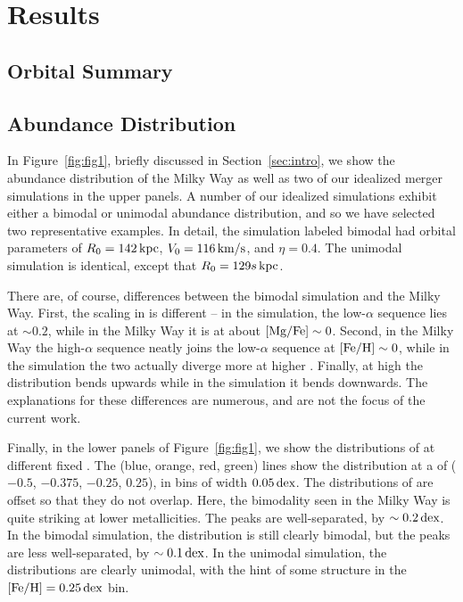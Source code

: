 \section{Results}\label{sec:results}
\subsection{Orbital Summary}\label{ssec:orbit}

\subsection{Abundance Distribution}\label{ssec:abundplane}
In Figure~\ref{fig:fig1}, briefly discussed in Section~\ref{sec:intro}, we show the abundance distribution of the Milky Way as well as two of our idealized merger simulations in the upper panels. A number of our idealized simulations exhibit either a bimodal or unimodal abundance distribution, and so we have selected two representative examples. In detail, the simulation labeled bimodal had orbital parameters of $R_0=142\,\textrm{kpc}$, $V_0=116\,\textrm{km}/\textrm{s}$, and $\eta=0.4$. The unimodal simulation is identical, except that $R_0=129s\,\textrm{kpc}$.

There are, of course, differences between the bimodal simulation and the Milky Way. First, the scaling in \MgFe{} is different -- in the simulation, the low-$\alpha$ sequence lies at $\sim0.2$, while in the Milky Way it is at about $[\textrm{Mg}/\textrm{Fe}]\sim0$. Second, in the Milky Way the high-$\alpha$ sequence neatly joins the low-$\alpha$ sequence at $[\textrm{Fe}/\textrm{H}]\sim0$, while in the simulation the two actually diverge more at higher \FeH{}. Finally, at high \FeH{} the distribution bends upwards while in the simulation it bends downwards. The explanations for these differences are numerous, and are not the focus of the current work.

Finally, in the lower panels of Figure~\ref{fig:fig1}, we show the distributions of \MgFe{} at different fixed \FeH{}. The (blue, orange, red, green) lines show the \MgFe{} distribution at a \FeH{} of ($-0.5$, $-0.375$, $-0.25$, $0.25$), in bins of width $0.05\,\textrm{dex}$. The distributions of \MgFe{} are offset so that they do not overlap. Here, the bimodality seen in the Milky Way is quite striking at lower metallicities. The peaks are well-separated, by $\sim0.2\,\textrm{dex}$. In the bimodal simulation, the distribution is still clearly bimodal, but the peaks are less well-separated, by $\sim0.1\,\textrm{dex}$. In the unimodal simulation, the distributions are clearly unimodal, with the hint of some structure in the $[\textrm{Fe}/\textrm{H}]=0.25\,\textrm{dex}$ bin.

